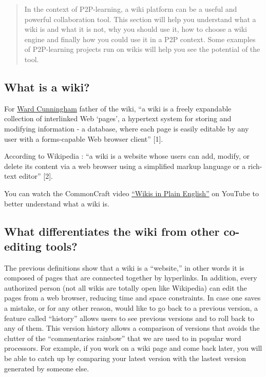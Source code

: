 \begin{quote}
In the context of P2P-learning, a wiki platform can be a useful and
powerful collaboration tool. This section will help you understand what
a wiki is and what it is not, why you should use it, how to choose a
wiki engine and finally how you could use it in a P2P context. Some
examples of P2P-learning projects run on wikis will help you see the
potential of the tool.
\end{quote}

\subsection{What is a wiki?}\label{what-is-a-wiki}

For \href{http://en.wikipedia.org/wiki/Ward_cunningham}{Ward Cunningham}
father of the wiki, ``a wiki is a freely expandable collection of
interlinked Web `pages', a hypertext system for storing and modifying
information - a database, where each page is easily editable by any user
with a forms-capable Web browser client'' {{[}1{]}}.

According to Wikipedia : ``a wiki is a website whose users can add,
modify, or delete its content via a web browser using a simplified
markup language or a rich-text editor'' {{[}2{]}}.

You can watch the CommonCraft video
\href{http://www.youtube.com/watch?v=-dnL00TdmLY}{``Wikis in Plain
English''} on YouTube to better understand what a wiki is.

\subsection{What differentiates the wiki from other co-editing
tools?}\label{what-differentiates-the-wiki-from-other-co-editing-tools}

The previous definitions show that a wiki is a ``website,'' in other
words it is composed of pages that are connected together by hyperlinks.
In addition, every authorized person (not all wikis are totally open
like Wikipedia) can edit the pages from a web browser, reducing time and
space constraints. In case one saves a mistake, or for any other reason,
would like to go back to a previous version, a feature called
``history'' allows users to see previous versions and to roll back to
any of them. This version history allows a comparison of versions that
avoids the clutter of the ``commentaries rainbow'' that we are used to
in popular word processors. For example, if you work on a wiki page and
come back later, you will be able to catch up by comparing your latest
version with the lastest version generated by someone else.

